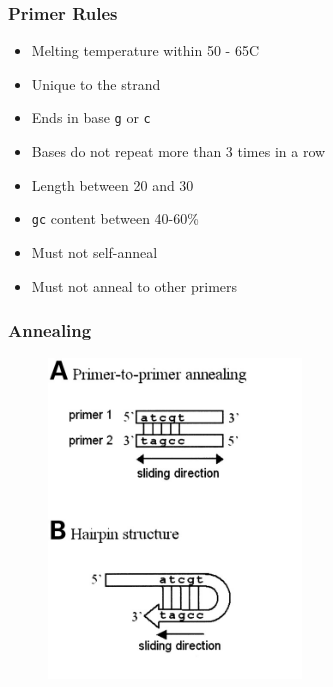 \begin{frame}
	\frametitle{Primer Rules}
	\begin{itemize}
		\item Melting temperature within 50 - 65\degree C
		\item Unique to the strand
		\item Ends in base \texttt{g} or \texttt{c}
		\item Bases do not repeat more than 3 times in a row
		\item Length between 20 and 30
		\item \texttt{gc} content between 40-60\%
		\item Must not self-anneal
		\item Must not anneal to other primers
	\end{itemize}
\end{frame}

\begin{frame}
\frametitle{Annealing}
\begin{figure}[!t]
  \begin{center}
    \includegraphics[width=0.6\textwidth]{./img/annealing.jpg}
  \end{center}
\end{figure}


\end{frame}     
